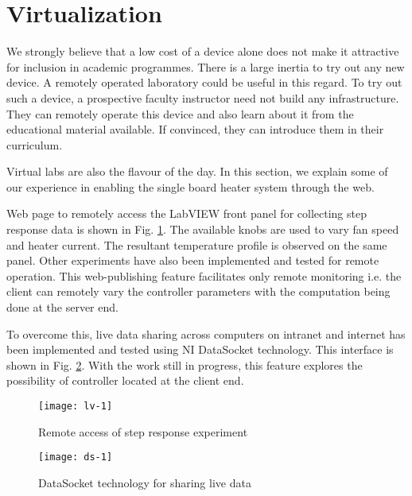 \section{Virtualization}
\label{sec:virtual}
We strongly believe that a low cost of a device alone does not make it
attractive for inclusion in academic programmes.  There is a large
inertia to try out any new device.  A remotely operated laboratory
could be useful in this regard.  To try out such a device, a
prospective faculty instructor need not build any infrastructure.
They can remotely operate this device and also learn about it from the
educational material available.  If convinced, they can introduce them
in their curriculum.

Virtual labs are also the flavour of the day.  In this section, we
explain some of our experience in enabling the single board heater
system through the web.



Web page to remotely access the LabVIEW front panel for collecting
step response data is shown in Fig. \ref{fig:rem-acc}. The available
knobs are used to vary fan speed and heater current. The resultant
temperature profile is observed on the same panel.  Other experiments
have also been implemented and tested for remote operation.  This
web-publishing feature facilitates only remote monitoring i.e. the
client can remotely vary the controller parameters with the
computation being done at the server end.

To overcome this, live data sharing across computers on intranet and
internet has been implemented and tested using NI DataSocket
technology. This interface is shown in Fig. \ref{fig:ds-inter}. With the
work still in progress, this feature explores the possibility of
controller located at the client end.

\begin{figure}
\centering
\texttt{[image: lv-1]}
\caption{Remote access of step response experiment}
\label{fig:rem-acc}
\end{figure}

\begin{figure}
\centering
\texttt{[image: ds-1]}
\caption{DataSocket technology for sharing live data}
\label{fig:ds-inter}
\end{figure}
